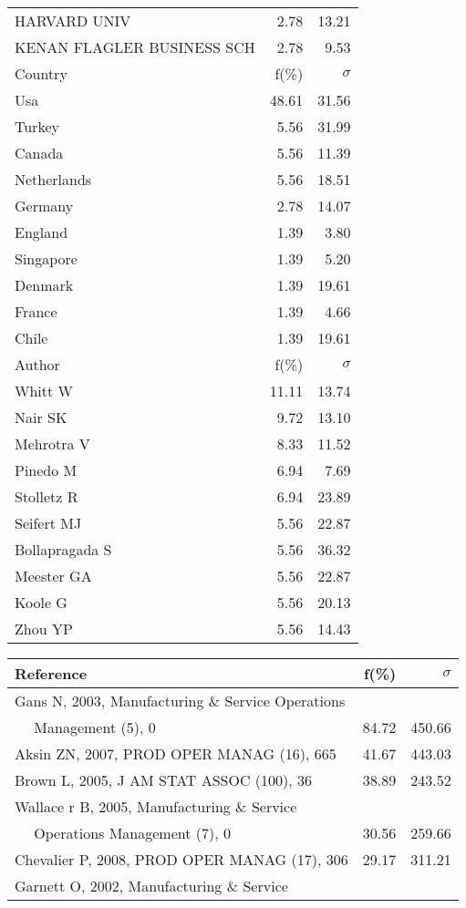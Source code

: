 \documentclass[a4paper,11pt]{report}
\begin{document}
\begin{landscape}
\begin{table}[!ht]
{\begin{tabular}{|l r r|}
HARVARD UNIV & 2.78 & 13.21\\
KENAN FLAGLER BUSINESS SCH & 2.78 & 9.53\\
\hline
\hline
Country & f(\%) & $\sigma$\\
\hline
Usa & 48.61 & 31.56\\
Turkey & 5.56 & 31.99\\
Canada & 5.56 & 11.39\\
Netherlands & 5.56 & 18.51\\
Germany & 2.78 & 14.07\\
England & 1.39 & 3.80\\
Singapore & 1.39 & 5.20\\
Denmark & 1.39 & 19.61\\
France & 1.39 & 4.66\\
Chile & 1.39 & 19.61\\
\hline
\hline
Author & f(\%) & $\sigma$\\
\hline
Whitt W & 11.11 & 13.74\\
Nair SK & 9.72 & 13.10\\
Mehrotra V & 8.33 & 11.52\\
Pinedo M & 6.94 & 7.69\\
Stolletz R & 6.94 & 23.89\\
Seifert MJ & 5.56 & 22.87\\
Bollapragada S & 5.56 & 36.32\\
Meester GA & 5.56 & 22.87\\
Koole G & 5.56 & 20.13\\
Zhou YP & 5.56 & 14.43\\
\hline
\end{tabular}
}
{\scriptsize\begin{tabular}{|l r r|}
\hline
Reference & f(\%) & $\sigma$\\
\hline
Gans N, 2003, Manufacturing \& Service Operations &  & \\
$\quad$ Management (5), 0 & 84.72 & 450.66\\
Aksin ZN, 2007, PROD OPER MANAG (16), 665 & 41.67 & 443.03\\
Brown L, 2005, J AM STAT ASSOC (100), 36 & 38.89 & 243.52\\
Wallace r B, 2005, Manufacturing \& Service &  & \\
$\quad$ Operations Management (7), 0 & 30.56 & 259.66\\
Chevalier P, 2008, PROD OPER MANAG (17), 306 & 29.17 & 311.21\\
Garnett O, 2002, Manufacturing \& Service &  & \\

\end{tabular}}
\end{table}
\end{landscape}
\end{document}
